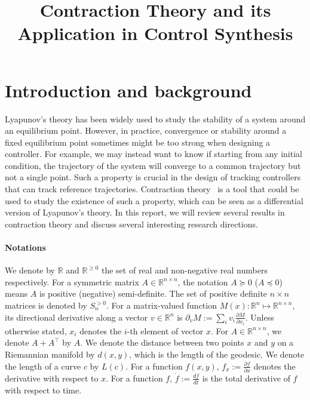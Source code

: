 \documentclass[12pt]{article}
\title{Contraction Theory and its Application in Control Synthesis}
\date{}
\newcommand{\T}{\intercal}
\newcommand{\reals}{\mathbb{R}}
\newcommand{\rp}{\reals^{\geq 0}}
\begin{document}
\maketitle

\section{Introduction and background}
Lyapunov's theory has been widely used to study the stability of a system around an equilibrium point. However, in practice, convergence or stability around a fixed equilibrium point sometimes might be too strong when designing a controller. For example, we may instead want to know if starting from any initial condition, the trajectory of the system will converge to a common trajectory but not a single point. Such a property is crucial in the design of tracking controllers that can track reference trajectories. Contraction theory~\cite{lohmiller1998contraction} is a tool that could be used to study the existence of such a property, which can be seen as a differential version of Lyapunov's theory. In this report, we will review several results in contraction theory and discuss several interesting research directions.

\paragraph{Notations} We denote by $\reals$ and $\rp$ the set of real and non-negative real numbers respectively. For a symmetric matrix $A \in \reals^{n\times n}$, the notation $A \succeq 0$ ($A \preceq 0$) means $A$ is positive (negative) semi-definite. The set of positive definite $n \times n$ matrices is denoted by $S_n^{>0}$. For a matrix-valued function $M(x):\reals^n \mapsto \reals^{n \times n}$, its directional derivative along a vector $v \in \reals^{n}$ is $\partial_v M := \sum_{i} v_i \frac{\partial M}{\partial x_i}$. Unless otherwise stated, $x_i$ denotes the $i$-th element of vector $x$. For $A \in \reals^{n \times n}$, we denote $A + A^\T$ by $\hat{A}$. We denote the distance between two points $x$ and $y$ on a Riemannian manifold by $d(x,y)$, which is the length of the geodesic. We denote the length of a curve $c$ by $L(c)$. For a function $f(x,y)$, $f_x := \frac{\partial f}{\partial x}$ denotes the derivative with respect to $x$. For a function $f$, $\dot{f} := \frac{df}{dt}$ is the total derivative of $f$ with respect to time.
\end{document}
